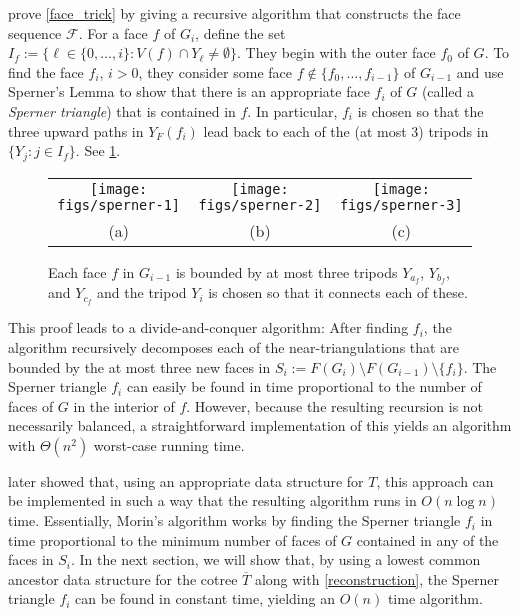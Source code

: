 \documentclass[a4paper,UKenglish,autoref]{lipics-v2021}
\begin{document}
\citet{dujmovic.joret.ea:planar} prove \cref{face_trick} by giving a recursive algorithm that constructs the face sequence $\mathcal{F}$.  For a face $f$ of $G_i$, define the set $I_f:=\{\ell\in\{0,\ldots,i\}:V(f)\cap Y_\ell\neq\emptyset\}$.  They begin with the outer face $f_0$ of $G$.  To find the face $f_i$, $i>0$, they consider some face $f\not\in\{f_0,\ldots,f_{i-1}\}$ of $G_{i-1}$ and use Sperner's Lemma to show that there is an appropriate face $f_i$ of $G$ (called a \emph{Sperner triangle}) that is contained in $f$. In particular, $f_i$ is chosen so that the three upward paths in $Y_F(f_i)$ lead back to each of the (at most 3) tripods in $\{Y_j:j\in I_f\}$. See \cref{sperner}.

\begin{figure}
  \begin{center}
    \begin{tabular}{ccc}
      \texttt{[image: figs/sperner-1]} &
      \texttt{[image: figs/sperner-2]} &
      \texttt{[image: figs/sperner-3]} \\
      (a) & (b) & (c)
    \end{tabular}
  \end{center}
  \caption{Each face $f$ in $G_{i-1}$ is bounded by at most three tripods $Y_{a_f}$, $Y_{b_f}$, and $Y_{c_f}$ and the tripod $Y_i$ is chosen so that it connects each of these.}
  \label{sperner}
\end{figure}

This proof leads to a divide-and-conquer algorithm: After finding $f_i$, the algorithm recursively decomposes each of the near-triangulations that are bounded by the at most three new faces in $S_i:=F(G_i)\setminus F(G_{i-1})\setminus \{f_i\}$.  The Sperner triangle $f_i$ can easily be found in time proportional to the number of faces of $G$ in the interior of $f$.  However, because the resulting recursion is not necessarily balanced, a straightforward implementation of this yields an algorithm with $\Theta(n^2)$ worst-case running time.

\citet{morin:fast} later showed that, using an appropriate data structure for $T$, this approach can be implemented in such a way that the resulting algorithm runs in $O(n\log n)$ time.  Essentially, Morin's algorithm works by finding the Sperner triangle $f_i$ in time proportional to the minimum number of faces of $G$ contained in any of the faces in $S_i$.  In the next section, we will show that, by using a lowest common ancestor data structure for the cotree $\overline{T}$ along with \cref{reconstruction}, the Sperner triangle $f_i$ can be found in constant time, yielding an $O(n)$ time algorithm.
\end{document}
